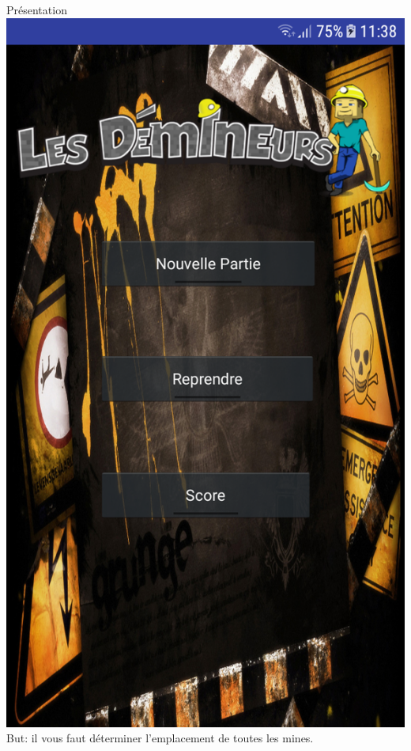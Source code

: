 \documentclass{beamer}
\begin{document}
\begin{frame}
\begin{block}{Présentation}
   \includegraphics[scale=0.15]{Images/Main.png}
But: il vous faut déterminer l'emplacement de toutes les mines.
\end{block}

\end{frame}


\end{document}
